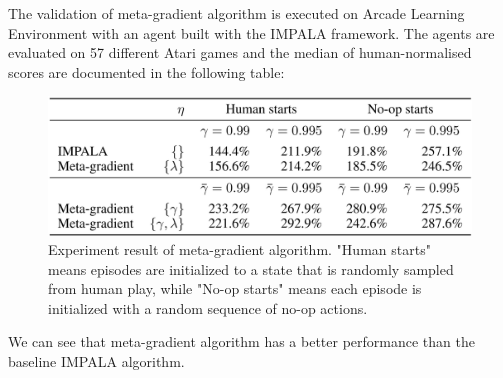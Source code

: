 \par
The validation of meta-gradient algorithm is executed on Arcade Learning Environment with an agent built with the IMPALA framework. The agents are evaluated on 57 different Atari games and the median of human-normalised scores are documented in the following table:
\begin{figure}[H]
	\includegraphics[scale=0.3]{meta-gradient-result.png}
	\centering
	\caption{Experiment result of meta-gradient algorithm. "Human starts" means episodes are initialized to a state that is randomly sampled from human play, while "No-op starts" means each episode is initialized with a random sequence of no-op actions.}
	\label{meta-gradient-result}
\end{figure}
We can see that meta-gradient algorithm has a better performance than the baseline IMPALA algorithm.
% 
% 
% 